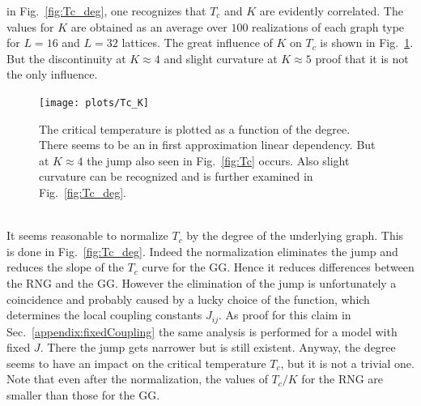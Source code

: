         in Fig.\ \ref{fig:Tc_deg},
        one recognizes that \(T_c\) and \(K\) are evidently correlated.
        The values for \(K\) are obtained as an average over \(100\)
        realizations of each graph type for \(L=16\) and \(L=32\) lattices.
        The great influence of \(K\) on \(T_c\) is shown in Fig.\ \ref{fig:Tc_K}.
        But the discontinuity at \(K \approx 4\) and slight curvature at
        \(K \approx 5\) proof that it is not the only influence.
        \begin{figure}[htb]
            \centering
            \texttt{[image: plots/Tc\_K]}
            \caption[Critical Temperature as a Function of the Degree of the Graph]
            {
                The critical temperature is plotted as a function of the
                degree. There seems to be an in first approximation linear
                dependency. But at \(K \approx 4\) the jump also seen in
                Fig.\ \ref{fig:Tc} occurs. Also slight curvature can be
                recognized and is further examined in Fig.\ \ref{fig:Tc_deg}.
            }
            \label{fig:Tc_K}
        \end{figure}\\
        It seems reasonable to normalize \(T_c\) by the degree of the underlying
        graph. This is done in Fig.\ \ref{fig:Tc_deg}.
        Indeed the normalization eliminates the jump and reduces the
        slope of the \(T_c\) curve for the GG. Hence it reduces differences
        between the RNG and the GG. However the elimination of the jump is
        unfortunately a coincidence and probably caused by a lucky choice of the
        function, which determines the local coupling constants \(J_{ij}\). As proof for
        this claim in Sec.\ \ref{appendix:fixedCoupling} the same analysis
        is performed for a model with fixed \(J\). There the jump gets narrower
        but is still existent. Anyway, the degree seems to have an impact on
        the critical temperature \(T_c\), but it is not a trivial one.
        Note that even after the normalization, the values of \(T_c / K\)
        for the RNG are smaller than those for the GG.
